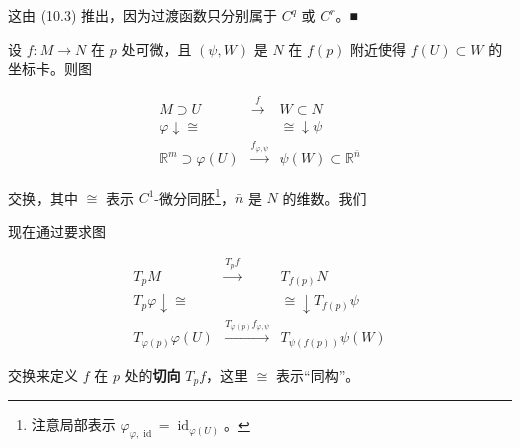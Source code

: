 \begin{remark}
\begin{items}
\proofhead
这由 (10.3) 推出，因为过渡函数只分别属于 $ C^{q} $ 或 $ C^{r} $。\nobreak\hspace{0.35em}■
\end{items}

设 $ f : M \to N $ 在 $ p $ 处可微，且 $ (\psi,W) $ 是 $ N $ 在 $ f(p) $ 附近使得 $ f(U) \subset W $ 的坐标卡。则图

\begin{equation}
\begin{array}{ccc} M \supset U & \xrightarrow{f} & W \subset N \\ \varphi \downarrow \cong & & \cong \downarrow \psi \\ \mathbb{R}^{m} \supset \varphi(U) & \xrightarrow{f_{\varphi,\psi}} & \psi(W) \subset \mathbb{R}^{\bar{n}} \end{array}\tag{10.4}
\end{equation}

交换，其中 $ \cong $ 表示 $ C^{1} $-微分同胚\footnote{注意局部表示 $ \varphi_{\varphi,\operatorname{id}} = \operatorname{id}_{\varphi(U)} $。}，$ \bar{n} $ 是 $ N $ 的维数。我们

现在通过要求图

\begin{equation}
\begin{array}{ccc} T_{p}M & \xrightarrow{T_{p}f} & T_{f(p)}N \\ T_{p}\varphi \downarrow \cong & & \cong \downarrow T_{f(p)}\psi \\ T_{\varphi(p)}\varphi(U) & \xrightarrow{T_{\varphi(p)}f_{\varphi,\psi}} & T_{\psi(f(p))}\psi(W) \end{array}\tag{10.5}
\end{equation}

交换来定义 $ f $ 在 $ p $ 处的\textbf{切向} $ T_{p}f $，这里 $ \cong $ 表示“同构”。

\end{remark}

